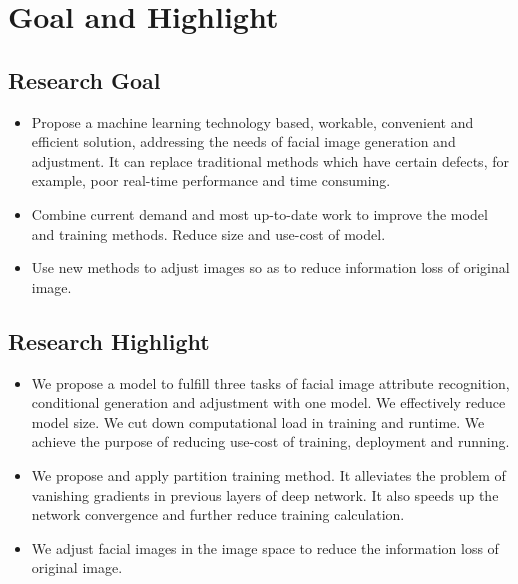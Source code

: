 \section{Goal and Highlight}

\subsection{Research Goal}
\begin{itemize}
\item Propose a machine learning technology based, workable, convenient and efficient solution,
    addressing the needs of facial image generation and adjustment.
    It can replace traditional methods which have certain defects, for example, poor real-time performance and time consuming.
\item Combine current demand and most up-to-date work to improve the model and training methods.
    Reduce size and use-cost of model.
\item Use new methods to adjust images so as to reduce information loss of original image.
\end{itemize}
\subsection{Research Highlight}
\begin{itemize}
\item We propose a model to fulfill three tasks of facial image attribute recognition,
    conditional generation and adjustment with one model.
    We effectively reduce model size.
    We cut down computational load in training and runtime.
    We achieve the purpose of reducing use-cost of training, deployment and running.
\item We propose and apply partition training method.
    It alleviates the problem of vanishing gradients in previous layers of deep network.
    It also speeds up the network convergence and further reduce training calculation.

\item We adjust facial images in the image space to reduce the information loss of original image.
\end{itemize}